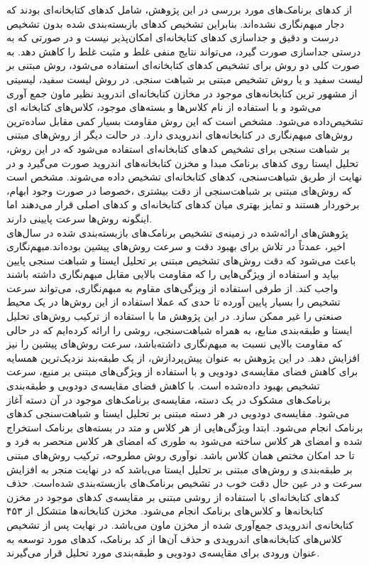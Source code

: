 از کد‌های برنامک‌های مورد بررسی در این پژوهش، شامل کد‌های کتابخانه‌ای بودند که دجار مبهم‌نگاری نشده‌اند. بنابراین تشخیص کد‌های بازبسته‌بندی شده بدون تشخیص درست و دقیق و جداسازی کد‌های کتابخانه‌ای امکان‌پذیر نیست و در صورتی که به درستی جداسازی صورت گیرد، می‌تواند نتایج منفی غلط و مثبت غلط را کاهش دهد. به صورت کلی دو روش برای تشخیص کد‌های کتابخانه‌ای استفاده می‌شود، روش‌ مبتنی بر لیست سفید و یا روش تشخیص مبتنی بر شباهت سنجی. در روش لیست سفید، لیسیتی از مشهور ترین کتابخانه‌های موجود در مخازن کتابخانه‌ای اندروید نظیر ماون جمع آوری می‌شود و با استفاده از نام‌ کلاس‌ها و بسته‌های موجود، کلاس‌های کتابخانه ای تشخیص‌داده می‌شود. مشخص است که این روش مقاومت بسیار کمی مقابل ساده‌ترین روش‌های مبهم‌نگاری در کتابخانه‌های اندرویدی دارد. در حالت دیگر از روش‌های مبتنی بر شباهت سنجی برای تشخیص کد‌های کتابخانه‌ای استفاده می‌شود که در این روش، تحلیل ایستا روی کد‌های برنامک‌ مبدا و مخزن کتابخانه‌های اندروید صورت می‌گیرد و در نهایت از طریق شیاهت‌سنجی، کد‌های کتابخانه‌ای تشخیص داده می‌شوند. مشخص است که روش‌های مبتنی بر شباهت‌سنجی از دقت بیشتری ،خصوصا در صورت وجود ابهام، برخوردار هستند و تمایز بهتری میان کد‌های کتابخانه‌ای و کد‌های اصلی قرار می‌دهند اما اینگونه روش‌ها سرعت پایینی دارند. 
\\
پژوهش‌های ارائه‌شده در زمینه‌ی تشخیص برنامک‌های بازبسته‌بندی شده در سال‌های اخیر، عمدتاً در تلاش برای بهبود دقت و سرعت روش‌های پیشین بوده‌اند.مبهم‌نگاری باعث می‌شود که دقت روش‌های تشخیص مبتنی بر تحلیل ایستا و شباهت سنجی پایین بیاید و استفاده از ویژگی‌هایی را که مقاومت بالایی مقابل مبهم‌نگاری داشته باشند واجب کند. از طرفی استفاده از ویزگی‌های مقاوم به مبهم‌نگاری، می‌تواند سرعت تشخیص را بسیار پایین آورده تا حدی که عملا استفاده از این روش‌ها در یک محیط صنعتی را غیر ممکن سازد. در این پژوهش ما با استفاده از ترکیب روش‌های تحلیل ایستا و طبقه‌بندی منابع، به همراه شباهت‌سنجی، روشی را ارائه‌ کرده‌ایم که در حالی که مقاومت بالایی نسبت به مبهم‌نگاری داشته‌باشد، سرعت روش‌های پیشین را نیز افزایش دهد. در این پژوهش به عنوان پیش‌پردازش، از یک طبقه‌بند نزدیک‌ترین همسایه برای کاهش فضای مقایسه‌ی دودویی و با استفاده از ویژگی‌های مبتنی بر منبع، سرعت تشخیص بهبود داده‌شده است. با کاهش فضای مقایسه‌ی دودویی و طبقه‌بندی برنامک‌های مشکوک در یک دسته، مقایسه‌ی برنامک‌های موجود در آن دسته آغاز می‌شود. مقایسه‌ی دودویی در هر دسته مبتنی بر تحلیل ایستا و شباهت‌سنجی کد‌های برنامک انجام می‌شود. ابتدا ویژگی‌هایی از هر کلاس و متد در بسته‌های برنامک استخراج شده و امضای هر کلاس ساخته می‌شود به طوری که امضای هر کلاس منحصر به فرد و تا حد امکان مختص همان کلاس باشد. نوآوری روش مطروحه، ترکیب روش‌های مبتنی بر طبقه‌بندی و روش‌های مبتنی بر تحلیل ایستا می‌باشد که در نهایت منجر به افزایش سرعت و در عین حال دقت خوب در تشخیص برنامک‌های بازبسته‌بندی شده‌است. حذف کد‌های کتابخانه‌ای با استفاده از روشی مبتنی بر مقایسه‌ی کد‌های موجود در مخزن کتابخانه‌ها و کلاس‌های برنامک انجام می‌شود. مخزن کتابخانه‌ها متشکل از ۴۵۳ کتابخانه‌ی اندرویدی جمع‌آوری شده‌ از مخزن ماون می‌باشد.  در نهایت پس از تشخیص کلاس‌های کتابخانه‌های اندرویدی و حذف آن‌ها از کد برنامک، کد‌های مورد توسعه به عنوان ورودی برای مقایسه‌ی دودویی و طبقه‌بندی مورد تحلیل قرار می‌گیرند.\\
